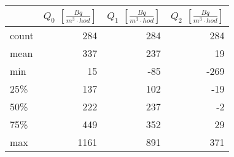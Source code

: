 \begin{tabular}{lrrr}
\toprule
{} &  $Q_0$ $\left[\si{\frac{Bq}{m^3\cdot hod}}\right]$ &  $Q_1$ $\left[\si{\frac{Bq}{m^3\cdot hod}}\right]$ &  $Q_2$ $\left[\si{\frac{Bq}{m^3\cdot hod}}\right]$ \\
\midrule
count &                                                284 &                                                284 &                                                284 \\
mean  &                                                337 &                                                237 &                                                 19 \\
min   &                                                 15 &                                                -85 &                                               -269 \\
25\%   &                                                137 &                                                102 &                                                -19 \\
50\%   &                                                222 &                                                237 &                                                 -2 \\
75\%   &                                                449 &                                                352 &                                                 29 \\
max   &                                               1161 &                                                891 &                                                371 \\
\bottomrule
\end{tabular}
